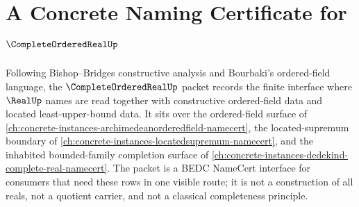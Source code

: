 \chapter{A Concrete Naming Certificate for $\CompleteOrderedRealUp$}
\label{ch:concrete-instances-completeorderedreal-namecert}

Following Bishop--Bridges constructive analysis and Bourbaki's ordered-field language, the $\CompleteOrderedRealUp$ packet records the finite interface where $\RealUp$ names are read together with constructive ordered-field data and located least-upper-bound data. It sits over the ordered-field surface of \autoref{ch:concrete-instances-archimedeanorderedfield-namecert}, the located-supremum boundary of \autoref{ch:concrete-instances-locatedsupremum-namecert}, and the inhabited bounded-family completion surface of \autoref{ch:concrete-instances-dedekind-complete-real-namecert}. The packet is a BEDC NameCert interface for consumers that need these rows in one visible route; it is not a construction of all reals, not a quotient carrier, and not a classical completeness principle.

